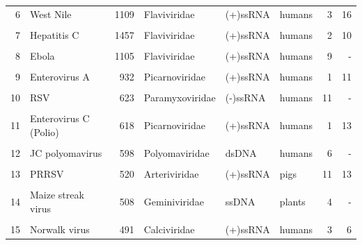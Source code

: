 \documentclass[landscape]{slides}
\begin{document}
\begin{slide}
\begin{center}
\begin{tabular}{r|l|r|l|l|l|r|r}
     \textcolor{myorange}{6} & \textcolor{myorange}{West Nile}          &        \textcolor{myorange}{1109} & \textcolor{myorange}{Flaviviridae}   & \textcolor{myorange}{(+)ssRNA} & \textcolor{myorange}{humans} &     \textcolor{myorange}{3} &      \textcolor{myorange}{16}  \\
       &                    &              &                &          &        &       &          \\ 
     7 & Hepatitis C        &        1457  & Flaviviridae   & (+)ssRNA & humans &     2 &      10  \\
       &                    &              &                &          &        &       &          \\ 
     8 & Ebola              &        1105  & Flaviviridae   & (+)ssRNA & humans &     9 &       -  \\
       &                    &              &                &          &        &       &          \\ 
     9 & Enterovirus A      &         932  & Picarnoviridae & (+)ssRNA & humans &     1 &      11  \\
       &                    &              &                &          &        &       &          \\ 
    10 & RSV                &         623  & Paramyxoviridae& (-)ssRNA & humans &    11 &       -  \\
       &                    &              &                &          &        &       &          \\ 
    11 & Enterovirus C (Polio) &      618  & Picarnoviridae & (+)ssRNA & humans &     1 &      13  \\
       &                    &              &                &          &        &       &          \\ 
    12 & JC polyomavirus    &          598 & Polyomaviridae & dsDNA    & humans &     6 &       -  \\
       &                    &              &                &          &        &       &          \\ 
    13 & PRRSV              &          520 & Arteriviridae  & (+)ssRNA & pigs   &    11 &      13  \\ %
       &                    &              &                &          &        &       &          \\ 
    \textcolor{myorange}{14} & \textcolor{myorange}{Maize streak virus} &          \textcolor{myorange}{508} & \textcolor{myorange}{Geminiviridae}  & \textcolor{myorange}{ssDNA}    & \textcolor{myorange}{plants} &     \textcolor{myorange}{4} &      \textcolor{myorange}{-}   \\
       &                    &              &                &          &        &       &          \\ 
    15 & Norwalk virus      &          491 &  Calciviridae  & (+)ssRNA & humans &     3 &       6  \\ 
\end{tabular}


\end{center}
\end{slide}
\end{document}
